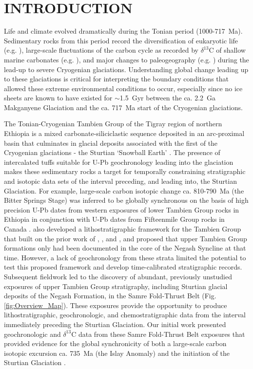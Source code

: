 \documentclass[11pt,letterpaper]{article}
\newcommand{\dC}{$\delta^{13}$C\xspace}
\begin{document}
\section*{INTRODUCTION \label{sec:INTRODUCTION}}

Life and climate evolved dramatically during the Tonian period (1000-717~Ma). Sedimentary rocks from this period record the diversification of eukaryotic life (e.g. \citealp{Knoll2006a, Butterfield2015a}), large-scale fluctuations of the carbon cycle as recorded by \dC of shallow marine carbonates (e.g. \citealp{Halverson2005a}), and major changes to paleogeography (e.g. \citealp{Li2008a, Li2013a}) during the lead-up to severe Cryogenian glaciations. Understanding global change leading up to these glaciations is critical for interpreting the boundary conditions that allowed these extreme environmental conditions to occur, especially since no ice sheets are known to have existed for $\sim$1.5~Gyr between the ca. 2.2~Ga Makganyene Glaciation \citep{Evans1997a} and the ca. 717~Ma start of the Cryogenian glaciations.

The Tonian-Cryogenian Tambien Group of the Tigray region of northern Ethiopia is a mixed carbonate-siliciclastic sequence deposited in an arc-proximal basin that culminates in glacial deposits associated with the first of the Cryogenian glaciations - the Sturtian `Snowball Earth' \citep{Beyth2003a, Miller2003a, Swanson-Hysell2015a, MacLennan2018a}. The presence of intercalated tuffs suitable for U-Pb geochronology leading into the glaciation makes these sedimentary rocks a target for temporally constraining stratigraphic and isotopic data sets of the interval preceding, and leading into, the Sturtian Glaciation. For example, large-scale carbon isotopic change ca. 810-790~Ma (the Bitter Springs Stage) was inferred to be globally synchronous on the basis of high precision U-Pb dates from western exposures of lower Tambien Group rocks in Ethiopia \citep{Swanson-Hysell2015a} in conjunction with U-Pb dates from Fifteenmile Group rocks in Canada \citep{Macdonald2010a}. \citet{Swanson-Hysell2015a} also developed a lithostratigraphic framework for the Tambien Group that built on the prior work of \citet{Beyth1972a}, \citet{Hailu1975a}, and \citet{Garland1980a}, and proposed that upper Tambien Group formations only had been documented in the core of the Negash Syncline at that time. However, a lack of geochronology from these strata limited the potential to test this proposed framework and develop time-calibrated stratigraphic records. Subsequent fieldwork led to the discovery of abundant, previously unstudied exposures of upper Tambien Group stratigraphy, including Sturtian glacial deposits of the Negash Formation, in the Samre Fold-Thrust Belt (Fig. \ref{fig:Overview_Map}). These exposures provide the opportunity to produce lithostratigraphic, geochronologic, and chemostratigraphic data from the interval immediately preceding the Sturtian Glaciation. Our initial work presented geochronologic and \dC data from these Samre Fold-Thrust Belt exposures that provided evidence for the global synchronicity of both a large-scale carbon isotopic excursion ca. 735~Ma (the Islay Anomaly) and the initiation of the Sturtian Glaciation \citep{MacLennan2018a}.
\end{document}
